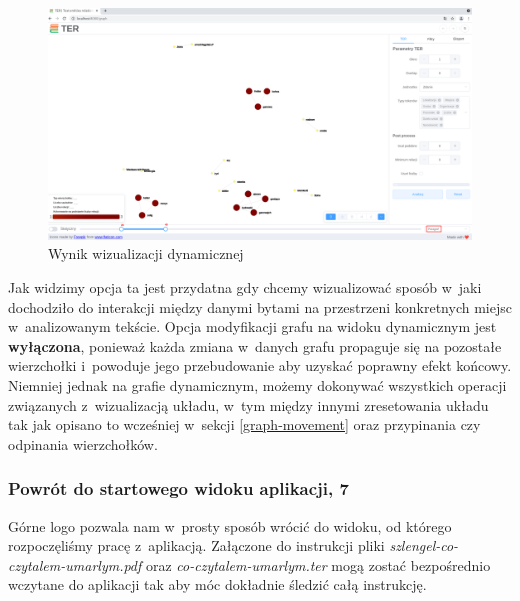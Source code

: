 \documentclass[12pt, a4paper]{article}
\begin{document}
\begin{figure}[H]
  \centering
  \includegraphics[width=\linewidth]{images/graph-dynamic.png}
  \caption{Wynik wizualizacji dynamicznej}
\end{figure}

Jak widzimy opcja ta jest przydatna gdy chcemy wizualizować sposób w~jaki dochodziło do interakcji między danymi bytami na przestrzeni konkretnych miejsc w~analizowanym tekście. Opcja modyfikacji grafu na widoku dynamicznym jest \textbf{wyłączona}, ponieważ każda zmiana w~danych grafu propaguje się na pozostałe wierzchołki i~powoduje jego przebudowanie aby uzyskać poprawny efekt końcowy. Niemniej jednak na grafie dynamicznym, możemy dokonywać wszystkich operacji związanych z~wizualizacją układu, w~tym między innymi zresetowania układu tak jak opisano to wcześniej w~sekcji \ref{graph-movement} oraz przypinania czy odpinania wierzchołków.

\subsubsection{Powrót do startowego widoku aplikacji, 7}

Górne logo pozwala nam w~prosty sposób wrócić do widoku, od którego rozpoczęliśmy pracę z~aplikacją. Załączone do instrukcji pliki \textit{szlengel-co-czytalem-umarlym.pdf} oraz \textit{co-czytalem-umarlym.ter} mogą zostać bezpośrednio wczytane do aplikacji tak aby móc dokładnie śledzić całą instrukcję.


\end{document}
